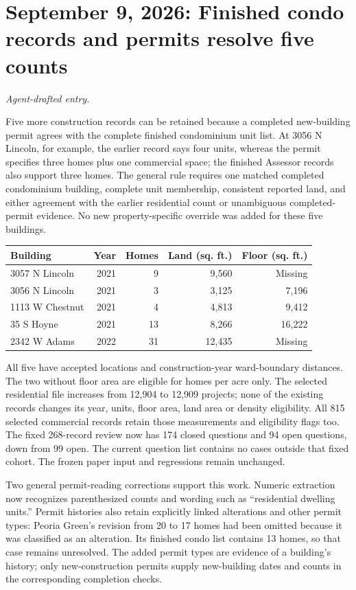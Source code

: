 \clearpage
\section*{September 9, 2026: Finished condo records and permits resolve five counts}
\textit{Agent-drafted entry.}

Five more construction records can be retained because a completed new-building permit agrees with the complete finished condominium unit list. At 3056 N Lincoln, for example, the earlier record says four units, whereas the permit specifies three homes plus one commercial space; the finished Assessor records also support three homes. The general rule requires one matched completed condominium building, complete unit membership, consistent reported land, and either agreement with the earlier residential count or unambiguous completed-permit evidence. No new property-specific override was added for these five buildings.

\begin{center}
\begin{tabular}{lrrrr}
\hline
Building & Year & Homes & Land (sq. ft.) & Floor (sq. ft.) \\
\hline
3057 N Lincoln & 2021 & 9 & 9,560 & Missing \\
3056 N Lincoln & 2021 & 3 & 3,125 & 7,196 \\
1113 W Chestnut & 2021 & 4 & 4,813 & 9,412 \\
35 S Hoyne & 2021 & 13 & 8,266 & 16,222 \\
2342 W Adams & 2022 & 31 & 12,435 & Missing \\
\hline
\end{tabular}
\end{center}

All five have accepted locations and construction-year ward-boundary distances. The two without floor area are eligible for homes per acre only. The selected residential file increases from 12,904 to 12,909 projects; none of the existing records changes its year, units, floor area, land area or density eligibility. All 815 selected commercial records retain those measurements and eligibility flags too. The fixed 268-record review now has 174 closed questions and 94 open questions, down from 99 open. The current question list contains no cases outside that fixed cohort. The frozen paper input and regressions remain unchanged.

Two general permit-reading corrections support this work. Numeric extraction now recognizes parenthesized counts and wording such as ``residential dwelling units.'' Permit histories also retain explicitly linked alterations and other permit types: Peoria Green's revision from 20 to 17 homes had been omitted because it was classified as an alteration. Its finished condo list contains 13 homes, so that case remains unresolved. The added permit types are evidence of a building's history; only new-construction permits supply new-building dates and counts in the corresponding completion checks.

